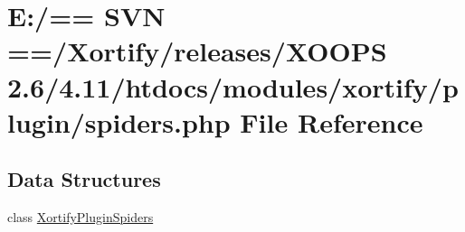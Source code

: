 \hypertarget{spiders_8php}{\section{E\-:/== S\-V\-N ==/\-Xortify/releases/\-X\-O\-O\-P\-S 2.6/4.11/htdocs/modules/xortify/plugin/spiders.php File Reference}
\label{spiders_8php}
}
\subsection*{Data Structures}
\begin{DoxyCompactItemize}
\item 
class \hyperlink{class_xortify_plugin_spiders}{Xortify\-Plugin\-Spiders}
\end{DoxyCompactItemize}
